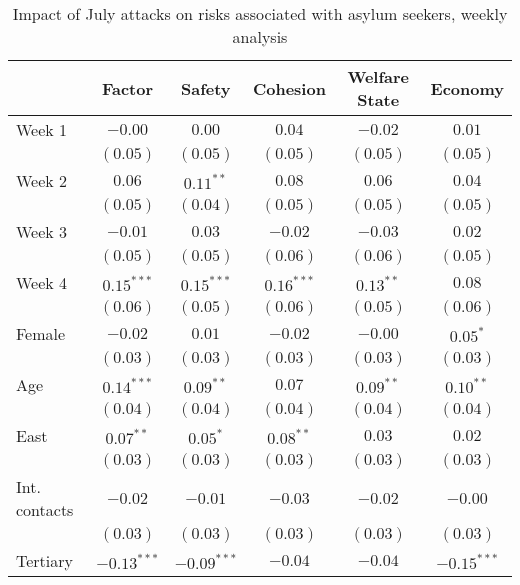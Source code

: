 
\begin{table}
\caption{Impact of July attacks on risks associated with asylum seekers, weekly analysis}
\begin{center}
\begin{tabular}{l c c c c c}
\toprule
 & Factor & Safety & Cohesion & Welfare State & Economy \\
\midrule
Week 1        & $-0.00$       & $0.00$        & $0.04$       & $-0.02$     & $0.01$        \\
              & $(0.05)$      & $(0.05)$      & $(0.05)$     & $(0.05)$    & $(0.05)$      \\
Week 2        & $0.06$        & $0.11^{**}$   & $0.08$       & $0.06$      & $0.04$        \\
              & $(0.05)$      & $(0.04)$      & $(0.05)$     & $(0.05)$    & $(0.05)$      \\
Week 3        & $-0.01$       & $0.03$        & $-0.02$      & $-0.03$     & $0.02$        \\
              & $(0.05)$      & $(0.05)$      & $(0.06)$     & $(0.06)$    & $(0.05)$      \\
Week 4        & $0.15^{***}$  & $0.15^{***}$  & $0.16^{***}$ & $0.13^{**}$ & $0.08$        \\
              & $(0.06)$      & $(0.05)$      & $(0.06)$     & $(0.05)$    & $(0.06)$      \\
Female        & $-0.02$       & $0.01$        & $-0.02$      & $-0.00$     & $0.05^{*}$    \\
              & $(0.03)$      & $(0.03)$      & $(0.03)$     & $(0.03)$    & $(0.03)$      \\
Age           & $0.14^{***}$  & $0.09^{**}$   & $0.07$       & $0.09^{**}$ & $0.10^{**}$   \\
              & $(0.04)$      & $(0.04)$      & $(0.04)$     & $(0.04)$    & $(0.04)$      \\
East          & $0.07^{**}$   & $0.05^{*}$    & $0.08^{**}$  & $0.03$      & $0.02$        \\
              & $(0.03)$      & $(0.03)$      & $(0.03)$     & $(0.03)$    & $(0.03)$      \\
Int. contacts & $-0.02$       & $-0.01$       & $-0.03$      & $-0.02$     & $-0.00$       \\
              & $(0.03)$      & $(0.03)$      & $(0.03)$     & $(0.03)$    & $(0.03)$      \\
Tertiary      & $-0.13^{***}$ & $-0.09^{***}$ & $-0.04$      & $-0.04$     & $-0.15^{***}$ \\

\end{tabular}
\end{center}
\end{table}
